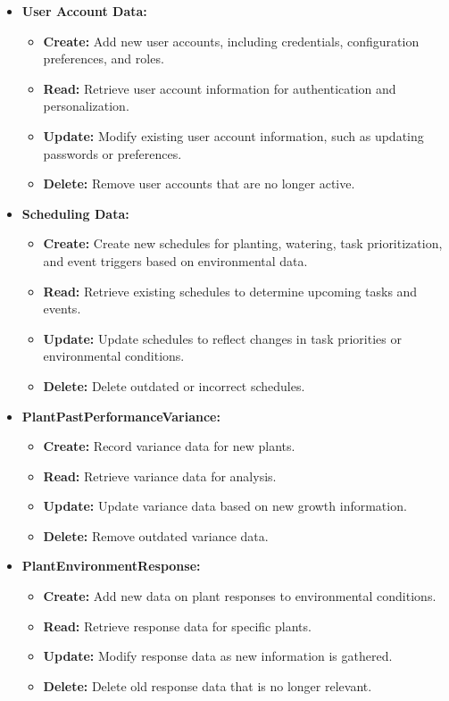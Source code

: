 \begin{itemize}
    \item \textbf{User Account Data:}
    \begin{itemize}
        \item \textbf{Create:} Add new user accounts, including credentials, configuration preferences, and roles.
        \item \textbf{Read:} Retrieve user account information for authentication and personalization.
        \item \textbf{Update:} Modify existing user account information, such as updating passwords or preferences.
        \item \textbf{Delete:} Remove user accounts that are no longer active.
    \end{itemize}
    
    \item \textbf{Scheduling Data:}
    \begin{itemize}
        \item \textbf{Create:} Create new schedules for planting, watering, task prioritization, and event triggers based on environmental data.
        \item \textbf{Read:} Retrieve existing schedules to determine upcoming tasks and events.
        \item \textbf{Update:} Update schedules to reflect changes in task priorities or environmental conditions.
        \item \textbf{Delete:} Delete outdated or incorrect schedules.
    \end{itemize}

    \item \textbf{PlantPastPerformanceVariance:}
    \begin{itemize}
        \item \textbf{Create:} Record variance data for new plants.
        \item \textbf{Read:} Retrieve variance data for analysis.
        \item \textbf{Update:} Update variance data based on new growth information.
        \item \textbf{Delete:} Remove outdated variance data.
    \end{itemize}

    \item \textbf{PlantEnvironmentResponse:}
    \begin{itemize}
        \item \textbf{Create:} Add new data on plant responses to environmental conditions.
        \item \textbf{Read:} Retrieve response data for specific plants.
        \item \textbf{Update:} Modify response data as new information is gathered.
        \item \textbf{Delete:} Delete old response data that is no longer relevant.
    \end{itemize}


\end{itemize}
